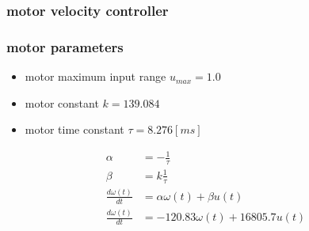 \documentclass{beamer}
\begin{document}
\begin{frame}
  
  \frametitle{\textbf { motor velocity controller}}


  
\end{frame}


\begin{frame}
  
  \frametitle{\textbf { motor parameters}}

  \begin{itemize}
    \item motor maximum input range $u_{max} = 1.0$
    \item motor constant $k = 139.084$
    \item motor time constant $\tau = 8.276[ms]$
  \end{itemize}

  \begin{align*}
    \alpha&= -\frac{1}{\tau} \\
    \beta&= k\frac{1}{\tau} \\
    \frac{d\omega(t)}{dt} &= \alpha \omega(t) + \beta u(t) \\
    \frac{d\omega(t)}{dt} &= -120.83 \omega(t) + 16805.7 u(t) 
  \end{align*}
  
\end{frame}
\end{document}
